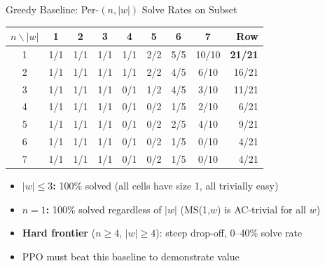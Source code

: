 \documentclass[aspectratio=169,11pt]{beamer}
\begin{document}
\begin{frame}{Greedy Baseline: Per-$(n, |w|)$ Solve Rates on Subset}
  \footnotesize
  \begin{center}
  \begin{tabular}{c|ccccccc|r}
    \toprule
    $n \backslash |w|$ & 1 & 2 & 3 & 4 & 5 & 6 & 7 & \textbf{Row} \\
    \midrule
    1 & \cellcolor{good!30}1/1 & \cellcolor{good!30}1/1 & \cellcolor{good!30}1/1 & \cellcolor{good!30}1/1 & \cellcolor{good!30}2/2 & \cellcolor{good!30}5/5 & \cellcolor{good!30}10/10 & \textcolor{good}{\textbf{21/21}} \\
    2 & \cellcolor{good!30}1/1 & \cellcolor{good!30}1/1 & \cellcolor{good!30}1/1 & \cellcolor{good!30}1/1 & \cellcolor{good!30}2/2 & \cellcolor{good!15}4/5 & \cellcolor{neutral!20}6/10 & 16/21 \\
    3 & \cellcolor{good!30}1/1 & \cellcolor{good!30}1/1 & \cellcolor{good!30}1/1 & \cellcolor{bad!20}0/1 & \cellcolor{bad!15}1/2 & \cellcolor{good!15}4/5 & \cellcolor{bad!20}3/10 & 11/21 \\
    4 & \cellcolor{good!30}1/1 & \cellcolor{good!30}1/1 & \cellcolor{good!30}1/1 & \cellcolor{bad!20}0/1 & \cellcolor{bad!30}0/2 & \cellcolor{bad!20}1/5 & \cellcolor{bad!20}2/10 & 6/21 \\
    5 & \cellcolor{good!30}1/1 & \cellcolor{good!30}1/1 & \cellcolor{good!30}1/1 & \cellcolor{bad!20}0/1 & \cellcolor{bad!30}0/2 & \cellcolor{bad!15}2/5 & \cellcolor{bad!15}4/10 & 9/21 \\
    6 & \cellcolor{good!30}1/1 & \cellcolor{good!30}1/1 & \cellcolor{good!30}1/1 & \cellcolor{bad!20}0/1 & \cellcolor{bad!30}0/2 & \cellcolor{bad!20}1/5 & \cellcolor{bad!30}0/10 & 4/21 \\
    7 & \cellcolor{good!30}1/1 & \cellcolor{good!30}1/1 & \cellcolor{good!30}1/1 & \cellcolor{bad!20}0/1 & \cellcolor{bad!30}0/2 & \cellcolor{bad!20}1/5 & \cellcolor{bad!30}0/10 & 4/21 \\
    \bottomrule
  \end{tabular}
  \end{center}

  \bigskip
  \begin{itemize}
    \item \textbf{$|w| \le 3$:} 100\% solved (all cells have size 1, all trivially easy)
    \item \textbf{$n = 1$:} 100\% solved regardless of $|w|$ (MS(1,$w$) is AC-trivial for all $w$)
    \item \textbf{Hard frontier} ($n \ge 4$, $|w| \ge 4$): steep drop-off, 0--40\% solve rate
    \item PPO must beat this baseline to demonstrate value
  \end{itemize}
\end{frame}
\end{document}
